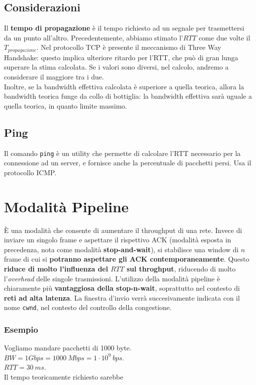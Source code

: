 \subsection{Considerazioni}
Il \textbf{tempo di propagazione} è il tempo richiesto ad un segnale per trasmettersi da un punto all'altro. Precedentemente, abbiamo stimato l'$RTT$ come due volte il $T_{propagazione}$. Nel protocollo TCP è presente il meccanismo di Three Way Handshake: questo implica ulteriore ritardo per l'RTT, che può di gran lunga superare la stima calcolata. Se i valori sono diversi, nel calcolo, andremo a considerare il maggiore tra i due.\\
Inoltre, se la bandwidth effettiva calcolata è superiore a quella teorica, allora la bandwidth teorica funge da collo di bottiglia: la bandwidth effettiva sarà uguale a quella teorica, in quanto limite massimo.

\subsection{Ping}
Il comando \verb|ping| è un utility che permette di calcolare l'RTT necessario per la connessione ad un server, e fornisce anche la percentuale di pacchetti persi. Usa il protocollo ICMP.

\newpage


\section{Modalità Pipeline}
È una modalità che consente di aumentare il throughput di una rete. Invece di inviare un singolo frame e aspettare il rispettivo ACK (modalità esposta in precedenza, nota come modalità \textbf{stop-and-wait}), si stabilisce una window di $n$ frame di cui si \textbf{potranno aspettare gli ACK contemporaneamente}. Questo\textbf{ riduce di molto l'influenza del $RTT$ sul throghput}, riducendo di molto l'\textit{overhead} delle singole trasmissioni. L'utilizzo della modalità pipeline è chiaramente più \textbf{vantaggiosa della stop-n-wait}, soprattutto nel contesto di \textbf{reti ad alta latenza}. La finestra d'invio verrà succesivamente indicata con il nome \verb|cwnd|, nel contesto del controllo della congestione.

\subsubsection{Esempio}
Vogliamo mandare pacchetti di 1000 byte.\\
$BW = 1 Gbps = 1000 \ Mbps = 1\cdot10^{9} \ bps$.\\
$RTT=30 \ ms$.\\
Il tempo teoricamente richiesto sarebbe


